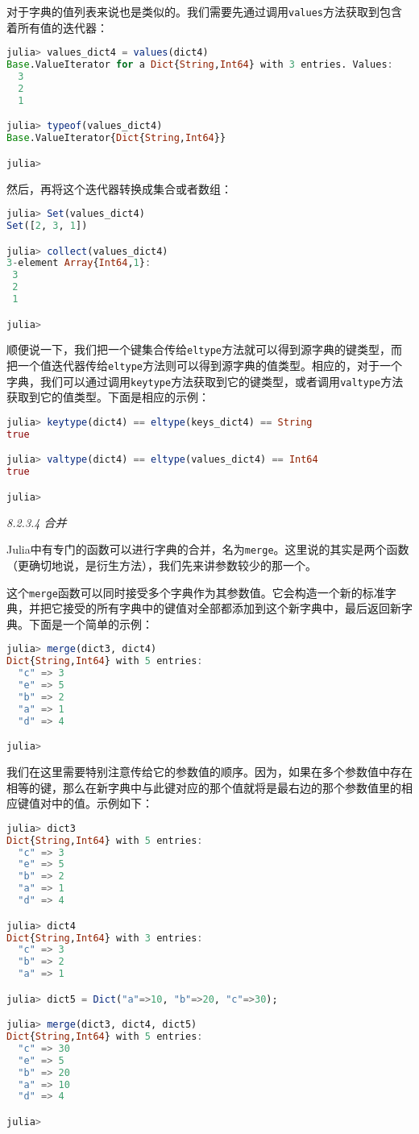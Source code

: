 对于字典的值列表来说也是类似的。我们需要先通过调用\verb|values|方法获取到包含着所有值的迭代器：
\begin{lstlisting}[language=julia]
julia> values_dict4 = values(dict4)
Base.ValueIterator for a Dict{String,Int64} with 3 entries. Values:
  3
  2
  1

julia> typeof(values_dict4)
Base.ValueIterator{Dict{String,Int64}}

julia> 
\end{lstlisting}

然后，再将这个迭代器转换成集合或者数组：
\begin{lstlisting}[language=julia]
julia> Set(values_dict4)
Set([2, 3, 1])

julia> collect(values_dict4)
3-element Array{Int64,1}:
 3
 2
 1

julia>
\end{lstlisting}

顺便说一下，我们把一个键集合传给\verb|eltype|方法就可以得到源字典的键类型，而把一个值迭代器传给\verb|eltype|方法则可以得到源字典的值类型。相应的，对于一个字典，我们可以通过调用\verb|keytype|方法获取到它的键类型，或者调用\verb|valtype|方法获取到它的值类型。下面是相应的示例：
\begin{lstlisting}[language=julia]
julia> keytype(dict4) == eltype(keys_dict4) == String
true

julia> valtype(dict4) == eltype(values_dict4) == Int64
true

julia> 
\end{lstlisting}

\textsl{8.2.3.4 合并}

Julia中有专门的函数可以进行字典的合并，名为\verb|merge|。这里说的其实是两个函数（更确切地说，是衍生方法），我们先来讲参数较少的那一个。

这个\verb|merge|函数可以同时接受多个字典作为其参数值。它会构造一个新的标准字典，并把它接受的所有字典中的键值对全部都添加到这个新字典中，最后返回新字典。下面是一个简单的示例：
\begin{lstlisting}[language=julia]
julia> merge(dict3, dict4)
Dict{String,Int64} with 5 entries:
  "c" => 3
  "e" => 5
  "b" => 2
  "a" => 1
  "d" => 4

julia> 
\end{lstlisting}

我们在这里需要特别注意传给它的参数值的顺序。因为，如果在多个参数值中存在相等的键，那么在新字典中与此键对应的那个值就将是最右边的那个参数值里的相应键值对中的值。示例如下：
\begin{lstlisting}[language=julia]
julia> dict3
Dict{String,Int64} with 5 entries:
  "c" => 3
  "e" => 5
  "b" => 2
  "a" => 1
  "d" => 4

julia> dict4
Dict{String,Int64} with 3 entries:
  "c" => 3
  "b" => 2
  "a" => 1

julia> dict5 = Dict("a"=>10, "b"=>20, "c"=>30);

julia> merge(dict3, dict4, dict5)
Dict{String,Int64} with 5 entries:
  "c" => 30
  "e" => 5
  "b" => 20
  "a" => 10
  "d" => 4

julia> 
\end{lstlisting}

